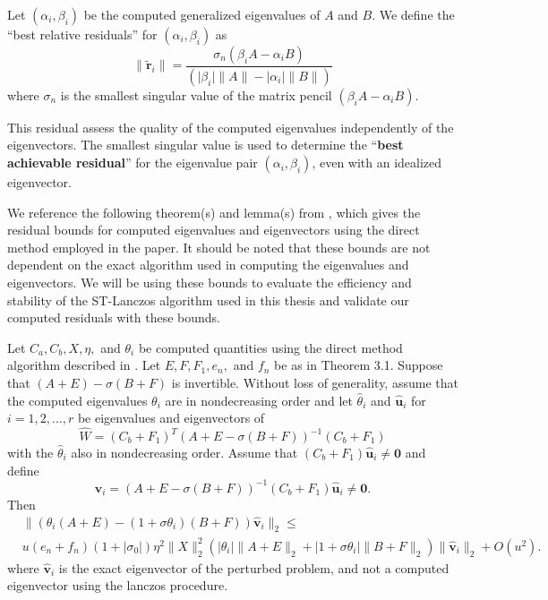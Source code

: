 \begin{definition}\label{def:BestResidual}
	Let $(\alpha_i, \beta_i)$ be the computed generalized eigenvalues of $A$ and $B$. We define the ``best relative residuals'' for $(\alpha_i, \beta_i)$ as
	\begin{equation}\label{eq:BestResiduals}
		\|\tilde{\mathbf{r}}_i\| = \frac{\sigma_n(\beta_i A - \alpha_i B)}{(\lvert \beta_i \rvert \|A\| - \lvert \alpha_i \rvert \|B\|)}
	\end{equation}
where $\sigma_n$ is the smallest singular value of the matrix pencil $(\beta_i A - \alpha_i B)$.
\end{definition}
This residual assess the quality of the computed eigenvalues independently of the eigenvectors. The smallest singular value is used to determine the ``\textbf{best achievable residual}'' for the eigenvalue pair $(\alpha_i, \beta_i)$, even with an idealized eigenvector.

We reference the following theorem(s) and lemma(s) from \cite{stewart2024spectraltransformationdensesymmetric}, which gives the residual bounds for computed eigenvalues and eigenvectors using the direct method employed in the paper. It should be noted that these bounds are not dependent on the exact algorithm used in computing the eigenvalues and eigenvectors. We will be using these bounds to evaluate the efficiency and stability of the ST-Lanczos algorithm used in this thesis and validate our computed residuals with these bounds.

\begin{theorem}\label{thrm:ResidualBoundsEigenvalues}
	Let $C_a, C_b, X, \eta,$ and $\theta_i$ be computed quantities using the direct method algorithm described in \cite{stewart2024spectraltransformationdensesymmetric}. Let $E, F, F_1, e_n,$ and $f_n$ be as in Theorem 3.1. Suppose that $(A + E) - \sigma(B + F)$ is invertible. Without loss of generality, assume that the computed eigenvalues $\theta_i$ are in nondecreasing order and let $\hat{\theta}_i$ and $\hat{\mathbf{u}}_i$ for $i = 1, 2, \dots, r$ be eigenvalues and eigenvectors of
	\[
	\hat{W} = (C_b + F_1)^{T} (A + E - \sigma(B + F))^{-1}(C_b + F_1)
	\]
	with the $\hat{\theta}_i$ also in nondecreasing order. Assume that $(C_b + F_1) \hat{\mathbf{u}}_i \neq \mathbf{0}$ and define
	\[
	\hat{\mathbf{v}}_i = (A + E - \sigma(B + F))^{-1} (C_b + F_1) \hat{\mathbf{u}}_i \neq \mathbf{0}.
	\]
	 Then
	\begin{align*}
		&\|(\theta_i (A + E) - (1 + \sigma \theta_i) (B + F)) \hat{\mathbf{v}}_i \|_2
		\leq \\
		& u (e_n + f_n)(1 + | \sigma_0 |) \eta^2 \| X \|_2^2 \left( | \theta_i | \| A + E \|_2 + | 1 + \sigma \theta_i | \| B + F \|_2 \right) \| \hat{\mathbf{v}}_i \|_2 + O(u^2).
	\end{align*}
where $\hat{\mathbf{v}}_i$ is the exact eigenvector of the perturbed problem, and not a computed eigenvector using the lanczos procedure.
\end{theorem}

